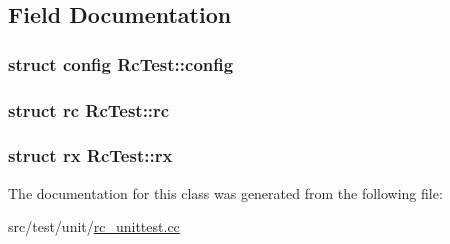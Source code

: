 \subsection{Field Documentation}
\hypertarget{classRcTest_aaa8c44656f38d3a9bd4425828404a87f}{
\subsubsection[{config}]{\setlength{\rightskip}{0pt plus 5cm}struct {\bf config} Rc\+Test\+::config\hspace{0.3cm}{\ttfamily [protected]}}}\label{classRcTest_aaa8c44656f38d3a9bd4425828404a87f}
\hypertarget{classRcTest_a37c63f2a8ea82169ec0c31c915877bef}{
\subsubsection[{rc}]{\setlength{\rightskip}{0pt plus 5cm}struct {\bf rc} Rc\+Test\+::rc\hspace{0.3cm}{\ttfamily [protected]}}}\label{classRcTest_a37c63f2a8ea82169ec0c31c915877bef}
\hypertarget{classRcTest_a7ab9af0e4c90dccb8f20106f3335b861}{
\subsubsection[{rx}]{\setlength{\rightskip}{0pt plus 5cm}struct {\bf rx} Rc\+Test\+::rx\hspace{0.3cm}{\ttfamily [protected]}}}\label{classRcTest_a7ab9af0e4c90dccb8f20106f3335b861}


The documentation for this class was generated from the following file\+:\begin{DoxyCompactItemize}
\item 
src/test/unit/\hyperlink{rc__unittest_8cc}{rc\+\_\+unittest.\+cc}\end{DoxyCompactItemize}
